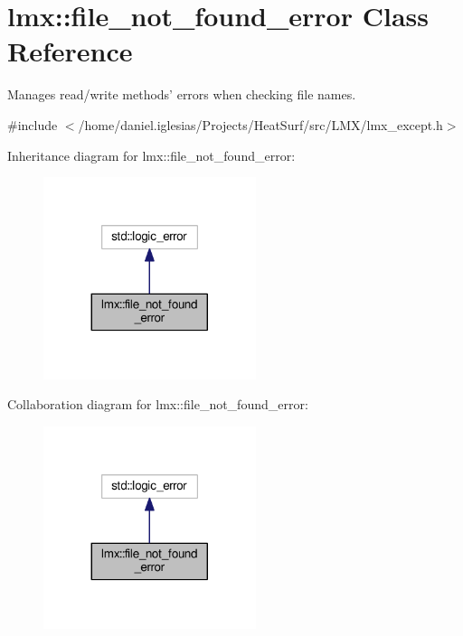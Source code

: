\hypertarget{classlmx_1_1file__not__found__error}{\section{lmx\-:\-:file\-\_\-not\-\_\-found\-\_\-error Class Reference}
\label{classlmx_1_1file__not__found__error}
}


Manages read/write methods' errors when checking file names.  




{\ttfamily \#include $<$/home/daniel.\-iglesias/\-Projects/\-Heat\-Surf/src/\-L\-M\-X/lmx\-\_\-except.\-h$>$}



Inheritance diagram for lmx\-:\-:file\-\_\-not\-\_\-found\-\_\-error\-:
\nopagebreak
\begin{figure}[H]
\begin{center}
\leavevmode
\includegraphics[width=176pt]{classlmx_1_1file__not__found__error__inherit__graph}
\end{center}
\end{figure}


Collaboration diagram for lmx\-:\-:file\-\_\-not\-\_\-found\-\_\-error\-:
\nopagebreak
\begin{figure}[H]
\begin{center}
\leavevmode
\includegraphics[width=176pt]{classlmx_1_1file__not__found__error__coll__graph}
\end{center}
\end{figure}
